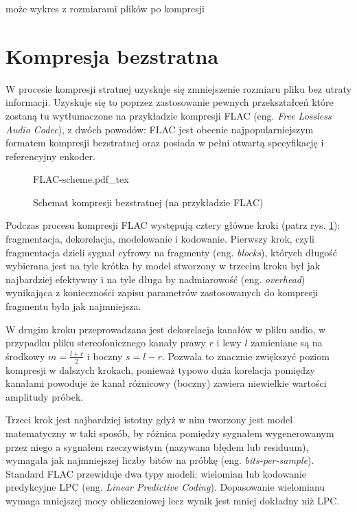 \documentclass[pl,12pt]{aghdpl}
\let\Oldsection\section%
\renewcommand{\section}{\FloatBarrier\Oldsection}
\begin{document}
{\color{red}może wykres z rozmiarami plików po kompresji}
\section{Kompresja bezstratna}

W procesie kompresji stratnej uzyskuje się zmniejszenie rozmiaru pliku bez
utraty informacji. Uzyskuje się to poprzez zastosowanie pewnych przekształceń
które zostaną tu wytłumaczone na przykładzie kompresji FLAC
(eng. \textit{Free Lossless Audio Codec}), z dwóch powodów: FLAC jest obecnie
najpopularniejszym formatem kompresji bezstratnej oraz posiada w pełni otwartą
specyfikację i referencyjny enkoder.

\begin{figure}[!tbh]
  \centering
  {FLAC-scheme.pdf_tex}
  \caption{Schemat kompresji bezstratnej (na przykładzie FLAC)}
  \label{fig:FLAC_scheme}
\end{figure}

Podczas procesu kompresji FLAC występują cztery główne kroki (patrz rys.
\ref{fig:FLAC_scheme}): fragmentacja, dekorelacja, modelowanie i kodowanie.
Pierwszy krok, czyli fragmentacja dzieli sygnał cyfrowy na fragmenty (eng.
\textit{blocks}), których długość wybierana jest na tyle krótka by model
stworzony w trzecim kroku był jak najbardziej efektywny i na tyle długa by
nadmiarowość (eng. \textit{overhead}) wynikająca z konieczności zapisu
parametrów zastosowanych do kompresji fragmentu była jak najmniejsza. 

W drugim kroku przeprowadzana jest dekorelacja kanałów w pliku audio, w
przypadku pliku stereofonicznego kanały prawy $r$ i lewy $l$ zamieniane są na środkowy
$m = \frac{l + r}{2}$ i boczny $s = l - r$. Pozwala to znacznie zwiększyć
poziom kompresji w dalszych krokach, ponieważ typowo duża korelacja pomiędzy
kanałami powoduje że kanał różnicowy (boczny) zawiera niewielkie wartości
amplitudy próbek.

Trzeci krok jest najbardziej istotny gdyż w nim tworzony jest model
matematyczny w taki sposób, by różnica pomiędzy sygnałem wygenerowanym przez
niego a sygnałem rzeczywistym (nazywana błędem lub residuum), wymagała
jak najmniejszej liczby bitów na próbkę (eng. \textit{bits-per-sample}).
Standard FLAC przewiduje dwa typy modeli: wielomian lub kodowanie predykcyjne
LPC (eng. \textit{Linear Predictive Coding}). Dopasowanie wielomianu wymaga
mniejszej mocy obliczeniowej lecz wynik jest mniej dokładny niż LPC.
\end{document}
